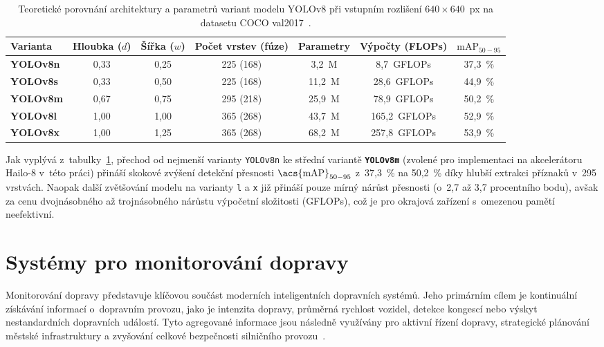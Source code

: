 \begin{table}[H]
    \centering
    \small\renewcommand{\arraystretch}{1.2}
    \setlength{\tabcolsep}{3pt}
    \begin{tabular}{|l|c|c|c|c|c|c|}
        \hline
        \textbf{Varianta} & \textbf{Hloubka ($d$)} & \textbf{Šířka ($w$)} & \textbf{Počet vrstev (fúze)} & \textbf{Parametry} & \textbf{Výpočty (FLOPs)} & \textbf{$\text{mAP}_{50-95}$} \\ \hline
        \textbf{YOLOv8n} & 0,33 & 0,25 & 225 (168) & 3,2~M & 8,7~GFLOPs & 37,3~\% \\ \hline
        \textbf{YOLOv8s} & 0,33 & 0,50 & 225 (168) & 11,2~M & 28,6~GFLOPs & 44,9~\% \\ \hline
        \textbf{YOLOv8m} & 0,67 & 0,75 & 295 (218) & 25,9~M & 78,9~GFLOPs & 50,2~\% \\ \hline
        \textbf{YOLOv8l} & 1,00 & 1,00 & 365 (268) & 43,7~M & 165,2~GFLOPs & 52,9~\% \\ \hline
        \textbf{YOLOv8x} & 1,00 & 1,25 & 365 (268) & 68,2~M & 257,8~GFLOPs & 53,9~\% \\ \hline
    \end{tabular}
    \caption{Teoretické porovnání architektury a parametrů variant modelu YOLOv8 při vstupním rozlišení $640 \times 640$~px na datasetu COCO val2017~\cite{terven_yolo_review_2023, ultralytics_yolov8_docs}.}
    \label{tab:yolov8_variants}
\end{table}

Jak vyplývá z~tabulky~\ref{tab:yolov8_variants}, přechod od nejmenší varianty \texttt{YOLOv8n} ke střední variantě \textbf{\texttt{YOLOv8m}} (zvolené pro implementaci na akcelerátoru Hailo-8 v~této práci) přináší skokové zvýšení detekční přesnosti $\text{\acs{mAP}}_{50-95}$ z~37,3~\% na 50,2~\% díky hlubší extrakci příznaků v~295 vrstvách. Naopak další zvětšování modelu na varianty \texttt{l} a \texttt{x} již přináší pouze mírný nárůst přesnosti (o~2,7 až 3,7 procentního bodu), avšak za cenu dvojnásobného až trojnásobného nárůstu výpočetní složitosti (\acs{GFLOPs}), což je pro okrajová zařízení s~omezenou pamětí neefektivní.

\section{Systémy pro monitorování dopravy}
Monitorování dopravy představuje klíčovou součást moderních inteligentních dopravních systémů. Jeho primárním cílem je kontinuální získávání informací o~dopravním provozu, jako je intenzita dopravy, průměrná rychlost vozidel, detekce kongescí nebo výskyt nestandardních dopravních událostí. Tyto agregované informace jsou následně využívány pro aktivní řízení dopravy, strategické plánování městské infrastruktury a zvyšování celkové bezpečnosti silničního provozu~\cite{zhou_traffic_survey_2024}.

